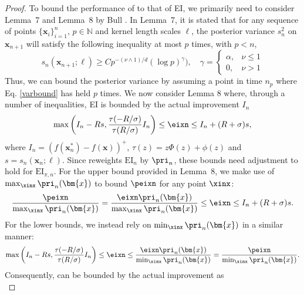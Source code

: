 \begin{proof}
To bound the performance of \pei{} to that of EI, we primarily need to consider Lemma~7 and Lemma~8 by Bull \cite{JMLR:v12:bull11a}. In Lemma~7, it is stated that for any sequence of points $\{\bm{x}_i\}_{i=1}^n$, $p \in \mathbb{N}$ 
and kernel length scales ${\bm{\ell}}$, the posterior variance $s^2_n$ 
on $\bm{x}_{n+1}$ will satisfy the following inequality at most $p$ times, with $p < n$, 
\begin{equation} \label{varbound}
    s_n(\bm{x}_{n+1}; \bm{\ell}) \geq Cp^{-(\nu \land 1)/d}(\log p)^\gamma), \quad \gamma = \begin{cases}
		\alpha, & \nu \leq 1\\
        0, & \nu > 1
	\end{cases}
\end{equation}
Thus, we can bound the posterior variance by assuming a point in time $n_p$ where Eq. \ref{varbound} has held $p$ times. 
We now consider Lemma 8 where, through a number of inequalities, EI is bounded by the actual improvement $I_n$
\begin{equation}
    \max\left(I_n-Rs, \frac{\tau(-R/\sigma)}{\tau(R/\sigma)}I_n   \right) \leq \eixn \leq I_n + (R + \sigma)s,
\end{equation}
where $I_n = (f(\bm{x}^*_n) - f(\bm{x}))^+$, $\tau(z) = z\Phi(z) + \phi(z)$ and $s = s_n(\bm{x}_{n}; \bm{\ell})$. Since \method reweights $\text{EI}_n$ by $\pri_n$, these bounds need adjustment to hold for $\text{EI}_{\pi, n}$. 
For the upper bound provided in Lemma~8, we make use of $\max_{\xinx} \pri_n(\bm{x})$ to bound $\peixn$ %
for any point $\xinx$: 
\begin{equation}
    \frac{\peixn} {\max_{\xinx} \pri_n(\bm{x})} = \frac{\eixn \pri_n(\bm{x})} {\max_{\xinx}\pri_n(\bm{x})} \leq \eixn \leq I_n + (R + \sigma)s.
\end{equation}
For the lower bounds, we instead rely on $\min_{\xinx} \pri_n(\bm{x})$ in a similar manner:
\begin{equation}
    \max\left(I_n-Rs, \frac{\tau(-R/\sigma)}{\tau(R/\sigma)}I_n   \right) \leq \eixn \leq \frac{\eixn \pri_n(\bm{x})} {\min_{\xinx}\pri_n(\bm{x})}  = \frac{\peixn} {\min_{\xinx} \pri_n(\bm{x})}.
\end{equation}
Consequently, \pei{} can be bounded by the actual improvement as
\begin{equation}

\end{equation}
\end{proof}
